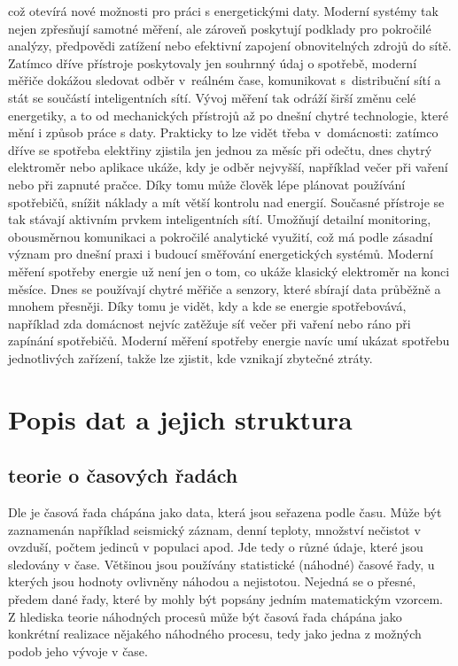 což otevírá nové možnosti pro práci s energetickými daty. Moderní systémy tak nejen zpřesňují samotné měření, ale zároveň poskytují podklady pro pokročilé analýzy, předpovědi zatížení nebo efektivní zapojení obnovitelných zdrojů do sítě.
Zatímco dříve přístroje poskytovaly jen souhrnný údaj o spotřebě, moderní měřiče dokážou sledovat odběr v~reálném čase, komunikovat s~distribuční sítí a stát se součástí inteligentních sítí.
Vývoj měření tak odráží širší změnu celé energetiky, a to od mechanických přístrojů až po dnešní chytré technologie, které mění i způsob práce s daty. Prakticky to lze vidět třeba v~domácnosti: zatímco dříve se spotřeba elektřiny zjistila jen jednou za měsíc při odečtu, dnes chytrý elektroměr nebo aplikace ukáže, kdy je odběr nejvyšší, například večer při vaření nebo při zapnuté pračce. Díky tomu může člověk lépe plánovat používání spotřebičů, snížit náklady a mít větší kontrolu nad energií. 
Současné přístroje se tak stávají aktivním prvkem inteligentních sítí. Umožňují detailní monitoring, obousměrnou komunikaci a pokročilé analytické využití, což má podle \cite{Synergy2006} zásadní význam pro dnešní praxi i budoucí směřování energetických systémů.
Moderní měření spotřeby energie už není jen o tom, co ukáže klasický elektroměr na konci měsíce. Dnes se používají chytré měřiče a senzory, které sbírají data průběžně a mnohem přesněji. Díky tomu je vidět, kdy a kde se energie spotřebovává, například zda domácnost nejvíc zatěžuje síť večer při vaření nebo ráno při zapínání spotřebičů. Moderní měření spotřeby energie navíc umí ukázat spotřebu jednotlivých zařízení, takže lze zjistit, kde vznikají zbytečné ztráty.


\chapter{Popis dat a jejich struktura}

\section{teorie o časových řadách} 
Dle \cite{Krivy2012} je časová řada chápána jako data, která jsou seřazena podle času. Může být zaznamenán například seismický záznam, denní teploty, množství nečistot v ovzduší, počtem jedinců v populaci apod. Jde tedy o různé údaje, které jsou sledovány v čase. Většinou jsou používány statistické (náhodné) časové řady, u kterých jsou hodnoty ovlivněny náhodou a nejistotou. Nejedná se o přesné, předem dané řady, které by mohly být popsány jedním matematickým vzorcem. Z hlediska teorie náhodných procesů může být časová řada chápána jako konkrétní realizace nějakého náhodného procesu, tedy jako jedna z možných podob jeho vývoje v čase.


